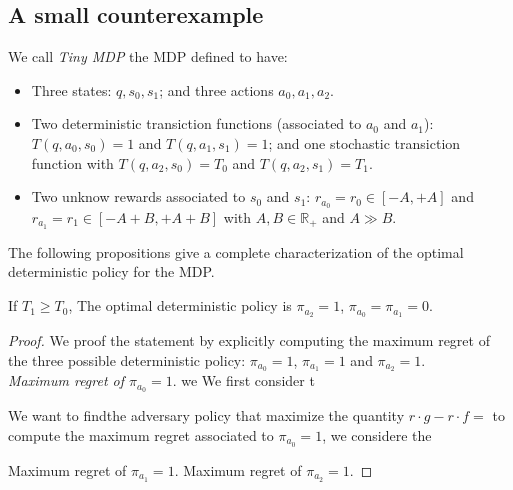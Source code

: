 \subsection{A small counterexample}

We call \textit{Tiny MDP} the MDP defined to have:
\begin{itemize}
\item Three states: $q, s_0, s_1$; and three actions $a_0, a_1, a_2$.
\item Two deterministic transiction functions (associated to $a_0$ and $a_1$): $T(q,a_0,s_0)=1$ and $T(q,a_1,s_1)=1$; and one stochastic transiction function with $T(q,a_2,s_0)=T_0$ and $T(q,a_2,s_1)=T_1$. 	 
\item Two unknow rewards associated to $s_0$ and $s_1$: $r_{a_0}= r_0\in[-A,+A]$ and $r_{a_1}= r_1\in[-A+B,+A+B]$ with $A,B \in \mathbb{R}_+$ and $A \gg B$.
\end{itemize} 
The following propositions give a complete characterization of the optimal deterministic policy for the MDP.
\begin{proposition}
If $T_1\geq T_0$, The optimal deterministic policy is $\pi_{a_2}=1$, $\pi_{a_0}=\pi_{a_1}=0$. 
\end{proposition}
\begin{proof}
We proof the statement by explicitly computing the maximum regret of the three possible deterministic policy: $\pi_{a_0}=1$, $\pi_{a_1}=1$ and $\pi_{a_2}=1$.\\
\textit{Maximum regret of $\pi_{a_0}=1$}. we  
We first consider t

We want to findthe adversary policy that maximize the quantity $r \cdot g - r \cdot f= $ to compute the maximum regret associated to $\pi_{a_0}=1$, we considere the   



Maximum regret of $\pi_{a_1}=1$.
Maximum regret of $\pi_{a_2}=1$.
\end{proof}

